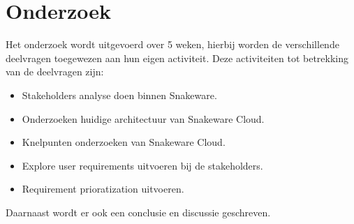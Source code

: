 \section{Onderzoek}
Het onderzoek wordt uitgevoerd over 5 weken, hierbij worden de verschillende deelvragen toegewezen aan hun eigen activiteit.
Deze activiteiten tot betrekking van de deelvragen zijn: \\
\begin{itemize}
    \item Stakeholders analyse doen binnen Snakeware.
    \item Onderzoeken huidige architectuur van Snakeware Cloud.
    \item Knelpunten onderzoeken van Snakeware Cloud.
    \item Explore user requirements uitvoeren bij de stakeholders.
    \item Requirement prioratization uitvoeren.
\end{itemize}
Daarnaast wordt er ook een conclusie en discussie geschreven.

